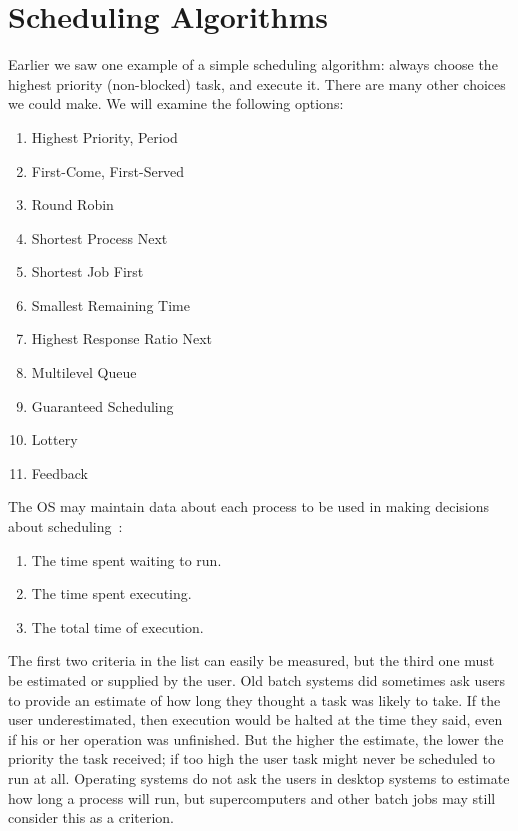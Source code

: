 




\section*{Scheduling Algorithms}

Earlier we saw one example of a simple scheduling algorithm: always choose the highest priority (non-blocked) task, and execute it. There are many other choices we could make. We will examine the following options:
\begin{enumerate}
	\item Highest Priority, Period
	\item First-Come, First-Served
	\item Round Robin
	\item Shortest Process Next
	\item Shortest Job First
	\item Smallest Remaining Time
	\item Highest Response Ratio Next
	\item Multilevel Queue
	\item Guaranteed Scheduling
	\item Lottery
	\item Feedback
\end{enumerate}

The OS may maintain data about each process to be used in making decisions about scheduling~\cite{osi}:

\begin{enumerate}
	\item The time spent waiting to run.
	\item The time spent executing.
	\item The total time of execution.
\end{enumerate}

The first two criteria in the list can easily be measured, but the third one must be estimated or supplied by the user. Old batch systems did sometimes ask users to provide an estimate of how long they thought a task was likely to take. If the user underestimated, then execution would be halted at the time they said, even if his or her operation was unfinished. But the higher the estimate, the lower the priority the task received; if too high the user task might never be scheduled to run at all. Operating systems do not ask the users in desktop systems to estimate how long a process will run, but supercomputers and other batch jobs may still consider this as a criterion.

